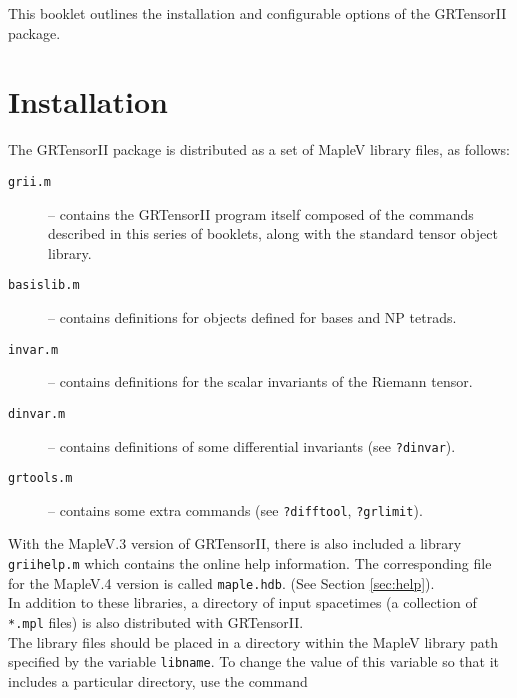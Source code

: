 \documentclass{article}
\begin{document}
\grlabel{\grSetupLabel}
\grtitle{\grSetupTitle}
\grtitlepage
\copyrightpage
This booklet outlines the installation and configurable options
of the GRTensorII package. 
%
\section{Installation} \label{sec:install}
%
The GRTensorII package is distributed as a set of MapleV library
files, as follows:
\begin{description}
  \item[\texttt{grii.m}] -- contains the GRTensorII program itself
    composed of the commands described in this series of booklets,
    along with the standard tensor object library.

  \item[\texttt{basislib.m}] -- contains definitions for objects defined
    for bases and NP tetrads.

  \item[\texttt{invar.m}] -- contains definitions for the scalar
    invariants of the Riemann tensor.

  \item[\texttt{dinvar.m}] -- contains definitions of some
    differential invariants (see \texttt{?dinvar}).

  \item[\texttt{grtools.m}] -- contains some extra commands (see
    \texttt{?difftool}, \texttt{?grlimit}).
\end{description}
With the MapleV.3 version of GRTensorII, there is also included
a library \texttt{griihelp.m} which contains the online help
information. The corresponding file for the MapleV.4 version
is called \texttt{maple.hdb}. (See Section \ref{sec:help}).\\

In addition to these libraries, a directory of input spacetimes
(a collection of \texttt{*.mpl} files) is also distributed
with GRTensorII.\\

The library files should be placed in a directory within the
MapleV library path specified by the variable \texttt{libname}.
To change the value of this variable so that it includes a
particular directory, use the command\\
\end{document}
